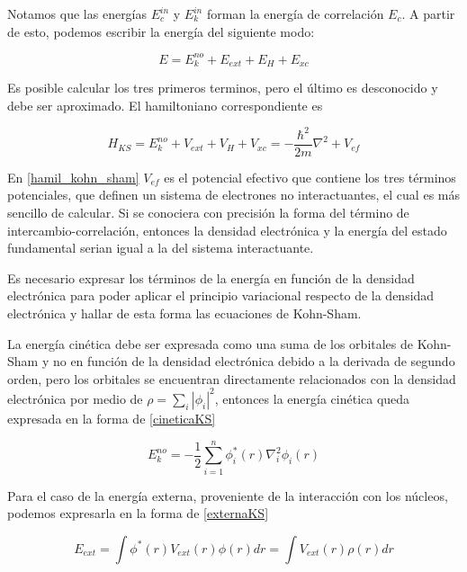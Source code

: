 \noindent Notamos que las energ\'ias $E_{c}^{in}$ y $E_{k}^{in}$ forman la 
energ\'ia de correlaci\'on $E_{c}$. A partir de esto, podemos escribir la 
energ\'ia del siguiente modo:

\begin{equation}
    E = E_{k}^{no} + E_{ext} + E_{H} + E_{xc}
\end{equation}

\noindent Es posible calcular los tres primeros terminos, pero el \'ultimo es 
desconocido y debe ser aproximado. El hamiltoniano correspondiente es

\begin{equation}\label {hamil_kohn_sham}
    H_{KS} = E_{k}^{no} + V_{ext} + V_{H} + V_{xc} = - \frac{\hbar ^{2}}{2m} 
    \nabla ^{2} + V_{ef}
\end{equation}

\noindent En \ref{hamil_kohn_sham} $V_{ef}$ es el potencial efectivo que 
contiene los tres t\'erminos potenciales, que definen un sistema de electrones 
no interactuantes, el cual es m\'as sencillo de calcular. Si se conociera con 
precisi\'on la forma del t\'ermino de intercambio-correlaci\'on, entonces la 
densidad electr\'onica y la energ\'ia del estado fundamental serian igual a la 
del sistema interactuante. 

\noindent Es necesario expresar los t\'erminos de la energ\'ia en funci\'on de 
la densidad electr\'onica para poder aplicar el principio variacional respecto 
de la densidad electr\'onica y hallar de esta forma las ecuaciones de Kohn-Sham.

\noindent La energ\'ia cin\'etica debe ser expresada como una suma de los 
orbitales de Kohn-Sham y no en funci\'on de la densidad electr\'onica debido a 
la derivada de segundo orden, pero los orbitales se encuentran directamente 
relacionados con la densidad electr\'onica por medio de $\rho = \sum _{i} |\phi 
_{i}|^{2}$, entonces la energ\'ia cin\'etica queda expresada en la forma de
\ref{cineticaKS}

\begin{equation} \label{cineticaKS}
    E_{k}^{no} = -\frac{1}{2} \sum _{i=1}^{n} \phi _{i}^{\ast}(r)\nabla_{i}^{2} 
    \phi_{i}(r)
\end{equation}

\noindent Para el caso de la energ\'ia externa, proveniente de la interacci\'on 
con los 
n\'ucleos, podemos expresarla en la forma de \ref{externaKS}

\begin{equation} \label{externaKS}
    E_{ext} = \int \phi ^{\ast }(r) V_{ext}(r) \phi (r) dr = \int V_{ext}(r) 
    \rho (r) dr
\end{equation}

